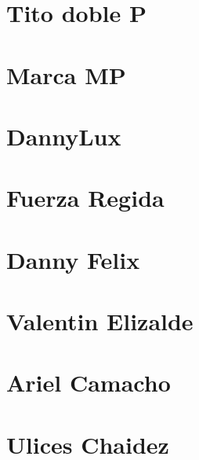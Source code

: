 \documentclass{article}
\begin{document}
\section{Tito doble P}



\section{Marca MP}


\section{DannyLux}


\section{Fuerza Regida}





\section{Danny Felix}

\section{Valentin Elizalde}


\section{Ariel Camacho}




\section{Ulices Chaidez}

\end{document}
